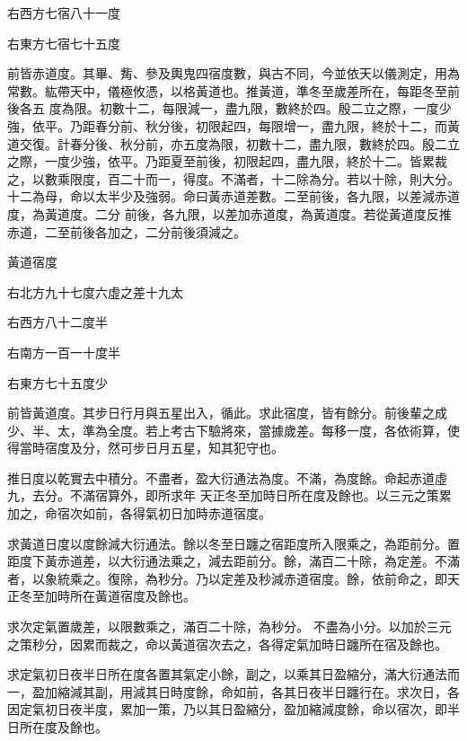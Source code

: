 \begin{pinyinscope}
 右西方七宿八十一度



 右東方七宿七十五度



 前皆赤道度。其畢、觜、參及輿鬼四宿度數，與古不同，今並依天以儀測定，用為常數。紘帶天中，儀極攸憑，以格黃道也。推黃道，準冬至歲差所在，每距冬至前後各五
 度為限。初數十二，每限減一，盡九限，數終於四。殷二立之際，一度少強，依平。乃距春分前、秋分後，初限起四，每限增一，盡九限，終於十二，而黃道交復。計春分後、秋分前，亦五度為限，初數十二，盡九限，數終於四。殷二立之際，一度少強，依平。乃距夏至前後，初限起四，盡九限，終於十二。皆累裁之，以數乘限度，百二十而一，得度。不滿者，十二除為分。若以十除，則大分。十二為母，命以太半少及強弱。命曰黃赤道差數。二至前後，各九限，以差減赤道度，為黃道度。二分
 前後，各九限，以差加赤道度，為黃道度。若從黃道度反推赤道，二至前後各加之，二分前後須減之。



 黃道宿度



 右北方九十七度六虛之差十九太



 右西方八十二度半



 右南方一百一十度半



 右東方七十五度少



 前皆黃道度。其步日行月與五星出入，循此。求此宿度，皆有餘分。前後輩之成少、半、太，準為全度。若上考古下驗將來，當據歲差。每移一度，各依術算，使得當時宿度及分，然可步日月五星，知其犯守也。



 推日度以乾實去中積分。不盡者，盈大衍通法為度。不滿，為度餘。命起赤道虛九，去分。不滿宿算外，即所求年
 天正冬至加時日所在度及餘也。以三元之策累加之，命宿次如前，各得氣初日加時赤道宿度。



 求黃道日度以度餘減大衍通法。餘以冬至日躔之宿距度所入限乘之，為距前分。置距度下黃赤道差，以大衍通法乘之，減去距前分。餘，滿百二十除，為定差。不滿者，以象統乘之。復除，為秒分。乃以定差及秒減赤道宿度。餘，依前命之，即天正冬至加時所在黃道宿度及餘也。



 求次定氣置歲差，以限數乘之，滿百二十除，為秒分。
 不盡為小分。以加於三元之策秒分，因累而裁之，命以黃道宿次去之，各得定氣加時日躔所在宿及餘也。



 求定氣初日夜半日所在度各置其氣定小餘，副之，以乘其日盈縮分，滿大衍通法而一，盈加縮減其副，用減其日時度餘，命如前，各其日夜半日躔行在。求次日，各因定氣初日夜半度，累加一策，乃以其日盈縮分，盈加縮減度餘，命以宿次，即半日所在度及餘也。




\end{pinyinscope}

